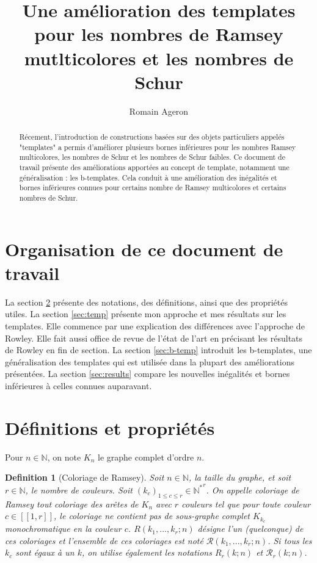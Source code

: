 \documentclass{article}
\title{Une amélioration des templates pour les nombres de Ramsey mutlticolores et les nombres de Schur}
\author{Romain Ageron}
\newtheorem{definition}{Definition}[section]
\begin{document}
\maketitle

\begin{abstract}
Récement, l'introduction de constructions basées sur des objets particuliers appelés "templates" a permis d'améliorer plusieurs bornes inférieures pour les nombres Ramsey multicolores, les nombres de Schur et les nombres de Schur faibles. Ce document de travail présente des améliorations apportées au concept de template, notamment une généralisation : les b-templates. Cela conduit à une amélioration des inégalités et bornes inférieures connues pour certains nombre de Ramsey multicolores et certains nombres de Schur.
\end{abstract}

\section{Organisation de ce document de travail}
La section \ref{sec:def} présente des notations, des définitions, ainsi que des propriétés utiles. La section \ref{sec:temp} présente mon approche et mes résultats sur les templates. Elle commence par une explication des différences avec l'approche de Rowley. Elle fait aussi office de revue de l'état de l'art en précisant les résultats de Rowley en fin de section. La section \ref{sec:b-temp} introduit les b-templates, une généralisation des templates qui est utilisée dans la plupart des améliorations présentées. La section \ref{sec:results} compare les nouvelles inégalités et bornes inférieures à celles connues auparavant.

\section{Définitions et propriétés}
\label{sec:def}

Pour \(n \in \mathbb{N}\), on note \(K_n\) le graphe complet d'ordre \(n\).

\begin{definition}[Coloriage de Ramsey]
Soit \(n \in \mathbb{N}\), la taille du graphe, et soit \(r \in \mathbb{N}\), le nombre de couleurs. Soit \((k_c)_{1 \leqslant c \leqslant r} \in {\mathbb{N}^*}^r\). On appelle coloriage de Ramsey tout coloriage des arêtes de \(K_n\) avec \(r\) couleurs tel que pour toute couleur \(c \in [\![1, r]\!]\), le coloriage ne contient pas de sous-graphe complet \(K_{k_c}\) monochromatique en la couleur \(c\). \(R(k_1, ..., k_r ; n)\) désigne l'un (quelconque) de ces coloriages et l'ensemble de ces coloriages est noté \(\mathcal{R}(k_1, ..., k_r ; n)\). Si tous les \(k_c\) sont égaux à un \(k\), on utilise également les notations \(R_r(k; n)\) et \(\mathcal{R}_r(k; n)\).
\end{definition}
\end{document}
